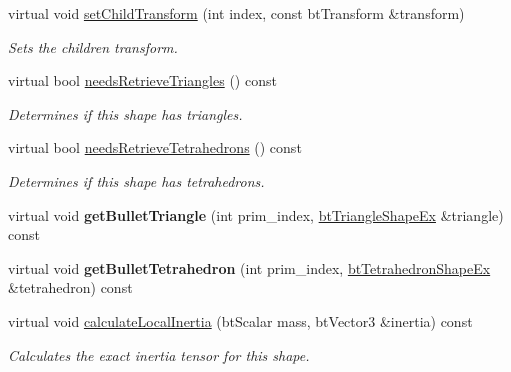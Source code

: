 \begin{DoxyCompactItemize}
virtual void \hyperlink{classbtGImpactCompoundShape_a560410e20842ad73227d7712a574385c}{set\+Child\+Transform} (int index, const bt\+Transform \&transform)
\begin{DoxyCompactList}\small\item\em Sets the children transform. \end{DoxyCompactList}\item 
\mbox{\label{classbtGImpactCompoundShape_ab3d78754ea1181c99ba0e982e863cca9}} 
virtual bool \hyperlink{classbtGImpactCompoundShape_ab3d78754ea1181c99ba0e982e863cca9}{needs\+Retrieve\+Triangles} () const
\begin{DoxyCompactList}\small\item\em Determines if this shape has triangles. \end{DoxyCompactList}\item 
\mbox{\label{classbtGImpactCompoundShape_abb543dfb4b62ec2de171c7cabdf66e37}} 
virtual bool \hyperlink{classbtGImpactCompoundShape_abb543dfb4b62ec2de171c7cabdf66e37}{needs\+Retrieve\+Tetrahedrons} () const
\begin{DoxyCompactList}\small\item\em Determines if this shape has tetrahedrons. \end{DoxyCompactList}\item 
\mbox{\label{classbtGImpactCompoundShape_a39de42da0f8e91f0bdce41eb7df70983}} 
virtual void {\bfseries get\+Bullet\+Triangle} (int prim\+\_\+index, \hyperlink{classbtTriangleShapeEx}{bt\+Triangle\+Shape\+Ex} \&triangle) const
\item 
\mbox{\label{classbtGImpactCompoundShape_aff66df97b1355545cbc5aecd85ef5432}} 
virtual void {\bfseries get\+Bullet\+Tetrahedron} (int prim\+\_\+index, \hyperlink{classbtTetrahedronShapeEx}{bt\+Tetrahedron\+Shape\+Ex} \&tetrahedron) const
\item 
\mbox{\label{classbtGImpactCompoundShape_a0b7c0e8fb17142e9f2a7f43951823c44}} 
virtual void \hyperlink{classbtGImpactCompoundShape_a0b7c0e8fb17142e9f2a7f43951823c44}{calculate\+Local\+Inertia} (bt\+Scalar mass, bt\+Vector3 \&inertia) const
\begin{DoxyCompactList}\small\item\em Calculates the exact inertia tensor for this shape. \end{DoxyCompactList}\item 

\end{DoxyCompactItemize}
